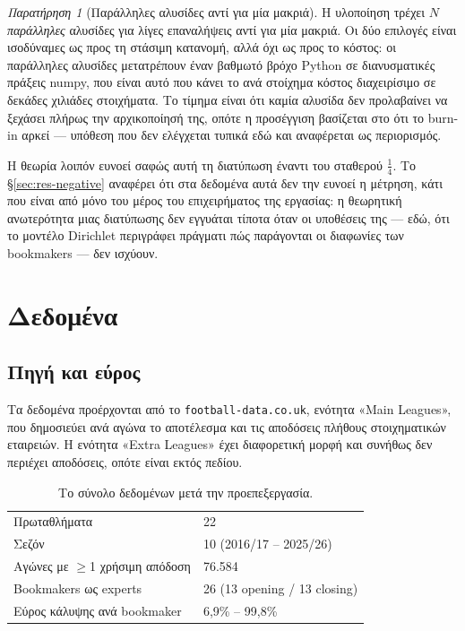 \documentclass[12pt,a4paper,oneside]{report}
\newcommand{\file}[1]{\texttt{#1}}
\newcommand{\en}[1]{\textenglish{#1}}
\renewcommand{\_}{\oldunderscore\allowbreak}
\theoremstyle{definition}
\theoremstyle{plain}
\theoremstyle{remark}
\newtheorem{remark}[theorem]{Παρατήρηση}
\begin{document}
\begin{remark}[Παράλληλες αλυσίδες αντί για μία μακριά]
Η υλοποίηση τρέχει $N$ \emph{παράλληλες} αλυσίδες για λίγες επαναλήψεις αντί για μία μακριά.
Οι δύο επιλογές είναι ισοδύναμες ως προς τη στάσιμη κατανομή, αλλά όχι ως προς το κόστος: οι
παράλληλες αλυσίδες μετατρέπουν έναν βαθμωτό βρόχο Python σε διανυσματικές πράξεις numpy,
που είναι αυτό που κάνει το ανά στοίχημα κόστος διαχειρίσιμο σε δεκάδες χιλιάδες στοιχήματα.
Το τίμημα είναι ότι καμία αλυσίδα δεν προλαβαίνει να ξεχάσει πλήρως την αρχικοποίησή της,
οπότε η προσέγγιση βασίζεται στο ότι το burn-in αρκεί --- υπόθεση που δεν ελέγχεται τυπικά
εδώ και αναφέρεται ως περιορισμός.
\end{remark}

Η θεωρία λοιπόν ευνοεί σαφώς αυτή τη διατύπωση έναντι του σταθερού $\tfrac14$. Το
\S\ref{sec:res-negative} αναφέρει ότι στα δεδομένα αυτά δεν την ευνοεί η μέτρηση, κάτι που
είναι από μόνο του μέρος του επιχειρήματος της εργασίας: η θεωρητική ανωτερότητα μιας
διατύπωσης δεν εγγυάται τίποτα όταν οι υποθέσεις της --- εδώ, ότι το μοντέλο Dirichlet
περιγράφει πράγματι πώς παράγονται οι διαφωνίες των bookmakers --- δεν ισχύουν.

\chapter{Δεδομένα}
\label{ch:data}

\section{Πηγή και εύρος}

Τα δεδομένα προέρχονται από το \file{football-data.co.uk}, ενότητα «\en{Main Leagues}», που
δημοσιεύει ανά αγώνα το αποτέλεσμα και τις αποδόσεις πλήθους στοιχηματικών εταιρειών. Η
ενότητα «\en{Extra Leagues}» έχει διαφορετική μορφή και συνήθως δεν περιέχει αποδόσεις,
οπότε είναι εκτός πεδίου.

\begin{table}[H]
\centering
\begin{tabular}{@{}ll@{}}
\toprule
Πρωταθλήματα & 22 \\
Σεζόν & 10 (2016/17 -- 2025/26) \\
Αγώνες με $\geq$1 χρήσιμη απόδοση & 76.584 \\
Bookmakers ως experts & 26 (13 opening / 13 closing) \\
Εύρος κάλυψης ανά bookmaker & 6,9\% -- 99,8\% \\
\bottomrule
\end{tabular}
\caption{Το σύνολο δεδομένων μετά την προεπεξεργασία.}
\end{table}
\end{document}
